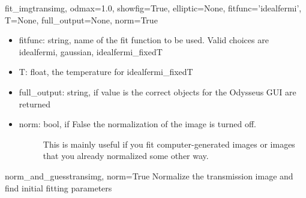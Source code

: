 \documentclass[letterpaper,10pt,english]{manual}
\begin{document}
\begin{funcdesc}{fit\_img}{transimg, odmax=1.0, showfig=True, elliptic=None, fitfunc='idealfermi', T=None, full\_output=None, norm=True}
\begin{itemize}
\item {} 
fitfunc: string, name of the fit function to be used. Valid choices are
idealfermi, gaussian, idealfermi\_fixedT

\item {} 
T: float, the temperature for idealfermi\_fixedT

\item {} 
full\_output: string, if value is  the correct objects for
the Odysseus GUI are returned

\item {} \begin{description}
\item[norm: bool, if False the normalization of the image is turned off.]
This is mainly useful if you fit computer-generated images or
images that you already normalized some other way.

\end{description}

\end{itemize}
\end{funcdesc}

\hypertarget{fitfermions.norm_and_guess}{}\begin{funcdesc}{norm\_and\_guess}{transimg, norm=True}
Normalize the transmission image and find initial fitting parameters
\end{funcdesc}
\end{document}
